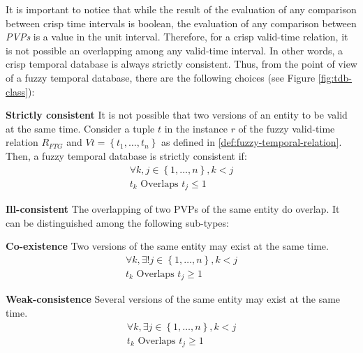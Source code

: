 It is important to notice that while the result of the evaluation of any comparison between crisp time intervals is boolean, the evaluation of any comparison between \emph{PVPs} is a value in the unit interval. Therefore, for a crisp valid-time relation, it is not possible an overlapping among any valid-time interval. In other words, a crisp temporal database is always strictly consistent. Thus, from the point of view of a fuzzy temporal database, there are the following choices (see Figure \ref{fig:tdb-class}):

\begin{definition}
\textbf{Strictly consistent} It is not possible that two versions of an entity to be valid at the same time.
Consider a tuple $t$ in the instance $r$ of the fuzzy valid-time relation $R_{FTG}$ and  $Vt = \left \lbrace t_1, \ldots, t_n \right \rbrace$ as defined in \ref{def:fuzzy-temporal-relation}. Then, a fuzzy temporal database is strictly consistent if: 
\begin{align}
\label{eq:stricly-consistent}
\forall k,j \in \left \lbrace 1, \ldots, n \right \rbrace, k < j\\
\nonumber t_k \mbox{ Overlaps } t_j \leq 1
\end{align}
\end{definition}




\begin{definition}
 \textbf{Ill-consistent} The overlapping of two PVPs of the same entity do overlap. It can be distinguished among the following sub-types:
\end{definition}
	      \begin{definition}
	      \textbf{Co-existence} Two versions of the same entity may exist at the same time.
		      \begin{align}
		      \forall k, \exists !j \in \left \lbrace 1, \ldots, n \right \rbrace, k < j\\
		      \nonumber t_k \mbox{ Overlaps } t_j \geq 1
		      \end{align}
	      \end{definition}


	      \begin{definition}
	      \textbf{Weak-consistence} Several versions of the same entity may exist at the same time.
		      \begin{align}
		      \label{eq:weak-consistence}
		      \forall k, \exists j \in \left \lbrace 1, \ldots, n \right \rbrace, k < j\\
		      \nonumber t_k \mbox{ Overlaps } t_j \geq 1
		      \end{align}
	      \end{definition}

